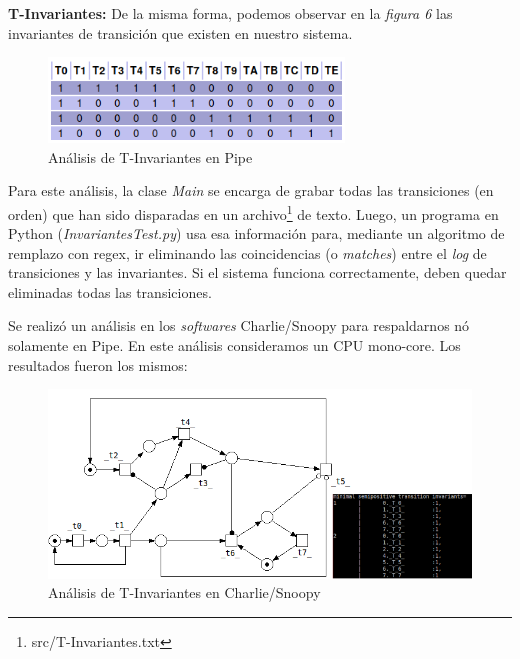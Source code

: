 \documentclass{article}
\newcommand{\fninv}{src/T-Invariantes.txt}
\begin{document}
    \textbf{T-Invariantes:} \newline \newline
    De la misma forma, podemos observar en la \emph{figura 6} las invariantes de transición
    que existen en nuestro sistema. \\
    \begin{figure}[H]
        \includegraphics[width=0.7\textwidth, center]{t-invariante.png}
        \caption{Análisis de T-Invariantes en Pipe}
    \end{figure}
    Para este análisis, la clase \emph{Main} se encarga de grabar todas las transiciones 
    (en orden) que han sido disparadas en un archivo\footnote{\fninv} de texto. Luego, un
    programa en Python (\emph{InvariantesTest.py}) usa esa información para, mediante un 
    algoritmo de remplazo con regex, ir eliminando las coincidencias (o \emph{matches}) 
    entre el \emph{log} de transiciones y las invariantes. Si el sistema funciona 
    correctamente, deben quedar eliminadas todas las transiciones. \newline \par
    Se realizó un análisis en los \emph{softwares} Charlie/Snoopy para respaldarnos nó 
    solamente en Pipe. En este análisis consideramos un CPU mono-core. Los resultados 
    fueron los mismos:
    \begin{figure}[H]
        \includegraphics[width=1.0\textwidth, center]{t-invariante-snoopy.png}
        \caption{Análisis de T-Invariantes en Charlie/Snoopy}
    \end{figure}
    \newpage
\end{document}
